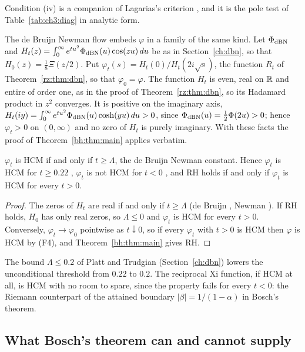 Condition (iv) is a companion of Lagarias's criterion \cite{Lagarias}, and it is the pole test of Table~\ref{tab:ch3:diag} in analytic form.

The de Bruijn Newman flow embeds $\varphi$ in a family of the same kind. Let $\Phi_{\rm dBN}$ and $H_t(z)=\int_0^\infty e^{tu^2}\Phi_{\rm dBN}(u)\cos(zu)\,du$ be as in Section~\ref{ch:dbn}, so that $H_0(z)=\frac18\Xi(z/2)$. Put $\varphi_t(s)=H_t(0)/H_t(2i\sqrt{s})$, the function $R_t$ of Theorem~\ref{rz:thm:dbn}, so that $\varphi_0=\varphi$. The function $H_t$ is even, real on $\mathbb{R}$ and entire of order one, as in the proof of Theorem~\ref{rz:thm:dbn}, so its Hadamard product in $z^2$ converges. It is positive on the imaginary axis, $H_t(iy)=\int_0^\infty e^{tu^2}\Phi_{\rm dBN}(u)\cosh(yu)\,du>0$, since $\Phi_{\rm dBN}(u)=\frac12\Phi(2u)>0$; hence $\varphi_t>0$ on $(0,\infty)$ and no zero of $H_t$ is purely imaginary. With these facts the proof of Theorem~\ref{bh:thm:main} applies verbatim.

\begin{corollary}\label{bh:cor:dbn}
$\varphi_t$ is HCM if and only if $t\ge\Lambda$, the de Bruijn Newman constant. Hence $\varphi_t$ is HCM for $t\ge0.22$ \cite{Polymath}, $\varphi_t$ is not HCM for $t<0$ \cite{RodgersTao}, and RH holds if and only if $\varphi_t$ is HCM for every $t>0$.
\end{corollary}

\begin{proof}
The zeros of $H_t$ are real if and only if $t\ge\Lambda$ (de Bruijn \cite{deBruijn}, Newman \cite{Newman1976}). If RH holds, $H_0$ has only real zeros, so $\Lambda\le0$ and $\varphi_t$ is HCM for every $t>0$. Conversely, $\varphi_t\to\varphi_0$ pointwise as $t\downarrow0$, so if every $\varphi_t$ with $t>0$ is HCM then $\varphi$ is HCM by (F4), and Theorem~\ref{bh:thm:main} gives RH.
\end{proof}

The bound $\Lambda\le0.2$ of Platt and Trudgian \cite{PT21} (Section~\ref{ch:dbn}) lowers the unconditional threshold from $0.22$ to $0.2$. The reciprocal Xi function, if HCM at all, is HCM with no room to spare, since the property fails for every $t<0$: the Riemann counterpart of the attained boundary $|\beta|=1/(1-\alpha)$ in Bosch's theorem.

\subsection{What Bosch's theorem can and cannot supply}\label{bh:sec:use}

